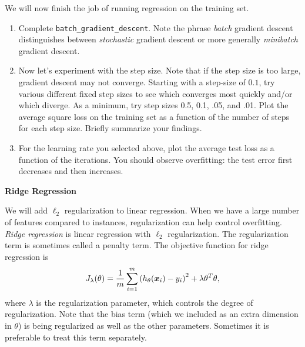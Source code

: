 \documentclass{article}
\newcommand{\nyuparagrah}[1]{\textcolor{nyupurple}{\large #1}}
\begin{document}
We will now finish the job of
running regression on the training set. 

\begin{enumerate}
\setcounter{enumi}{\value{saveenum}}
\item Complete \texttt{batch\_gradient\_descent}. Note the phrase \emph{batch} gradient descent distinguishes between \emph{stochastic} gradient
descent or more generally \emph{minibatch} gradient descent. 

\item Now let's experiment with the step size. Note that if the step size
is too large, gradient descent may not converge. Starting with a step-size of $0.1$, try various different fixed
step sizes to see which converges most quickly and/or which diverge.
As a minimum, try step sizes 0.5, 0.1, .05, and .01. Plot the average square loss on the training set as a function of the number of steps for
each step size. Briefly summarize your findings. 

\item For the learning rate you selected above, plot the average test loss as a function of the iterations. You should observe overfitting: the test error first decreases and then increases.

\newpage 

\setcounter{saveenum}{\value{enumi}}
\end{enumerate}

\vspace{0.3cm}
\nyuparagrah{\bf Ridge Regression}

We will add $\ell_2$ regularization to linear regression. When we have a large number of features compared to instances, regularization
can help control overfitting. \emph{Ridge regression} is linear regression
with $\ell_{2}$ regularization. The regularization term is sometimes
called a penalty term. The objective function for ridge regression
is
\[
J_\lambda(\theta)=\frac{1}{m}\sum_{i=1}^{m}\left(h_{\theta}(\boldsymbol{x}_{i})-y_{i}\right)^{2}+\lambda\theta^{T}\theta,
\]
where $\lambda$ is the regularization parameter, which controls the
degree of regularization. Note that the bias term (which we included as an extra dimension in $\theta$) is being regularized
as well as the other parameters. Sometimes it is preferable to treat this term separately.
\end{document}
